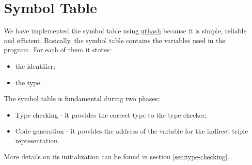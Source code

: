 \section{Symbol Table}
We have implemented the symbol table using
\href{https://troydhanson.github.io/uthash/}{uthash} because it is simple,
reliable and efficient. Basically, the symbol table contains the variables used
in the program. For each of them it stores:
\begin{itemize}
	\item the identifier;
	\item the type.
\end{itemize}

The symbol table is fundamental during two phases:
\begin{itemize}
	\item Type checking - it provides the correct type to the type checker;
	\item Code generation - it provides the address of the variable for the
	indirect triple representation.
\end{itemize}
More details on its initialization can be found in section
\ref{sec:type-checking}.

